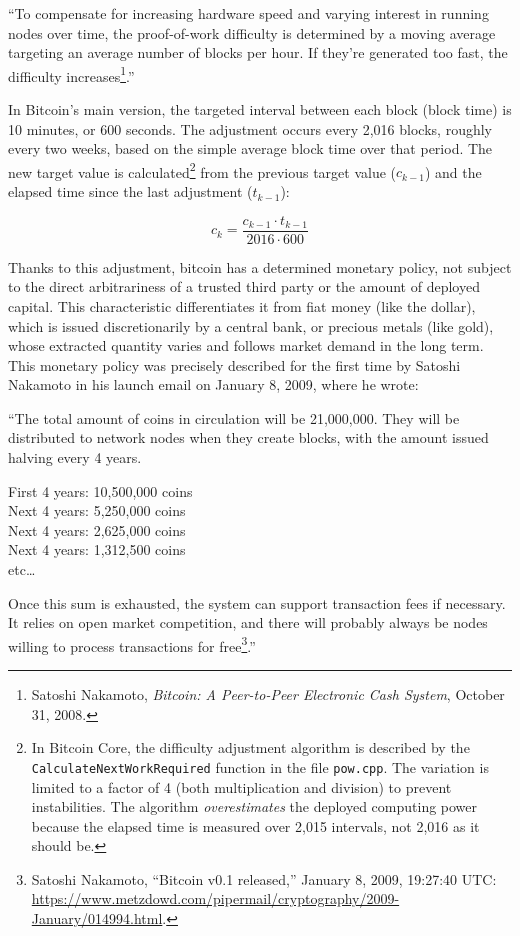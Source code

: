 \documentclass[
  a5paper,
  smalldemyvopaper,10pt,twoside,onecolumn,openright,extrafontsizes,hidelinks]{memoir}
\begin{document}
``To compensate for increasing hardware speed and varying interest in
running nodes over time, the proof-of-work difficulty is determined by a
moving average targeting an average number of blocks per hour. If
they're generated too fast, the difficulty increases\footnote{Satoshi
  Nakamoto, \emph{Bitcoin: A Peer-to-Peer Electronic Cash System},
  October 31, 2008.}.''

In Bitcoin's main version, the targeted interval between each block
(block time) is 10 minutes, or 600 seconds. The adjustment occurs every
2,016 blocks, roughly every two weeks, based on the simple average block
time over that period. The new target value is calculated\footnote{In
  Bitcoin Core, the difficulty adjustment algorithm is described by the
  \texttt{CalculateNextWorkRequired} function in the file
  \texttt{pow.cpp}. The variation is limited to a factor of 4 (both
  multiplication and division) to prevent instabilities. The algorithm
  \emph{overestimates} the deployed computing power because the elapsed
  time is measured over 2,015 intervals, not 2,016 as it should be.}
from the previous target value (\(c_{k-1}\)) and the elapsed time since
the last adjustment (\(t_{k-1}\)):

\[c_{k} = \frac{c_{k-1} \cdot t_{k-1}}{2016 \cdot 600}\]

Thanks to this adjustment, bitcoin has a determined monetary policy, not
subject to the direct arbitrariness of a trusted third party or the
amount of deployed capital. This characteristic differentiates it from
fiat money (like the dollar), which is issued discretionarily by a
central bank, or precious metals (like gold), whose extracted quantity
varies and follows market demand in the long term. This monetary policy
was precisely described for the first time by Satoshi Nakamoto in his
launch email on January 8, 2009, where he wrote:

``The total amount of coins in circulation will be 21,000,000. They will
be distributed to network nodes when they create blocks, with the amount
issued halving every 4 years.

First 4 years: 10,500,000 coins\\
Next 4 years: 5,250,000 coins\\
Next 4 years: 2,625,000 coins\\
Next 4 years: 1,312,500 coins\\
etc\ldots{}

Once this sum is exhausted, the system can support transaction fees if
necessary. It relies on open market competition, and there will probably
always be nodes willing to process transactions for free\footnote{Satoshi
  Nakamoto, ``Bitcoin v0.1 released,'' January 8, 2009, 19:27:40 UTC:
  \url{https://www.metzdowd.com/pipermail/cryptography/2009-January/014994.html}.}.''
\end{document}
